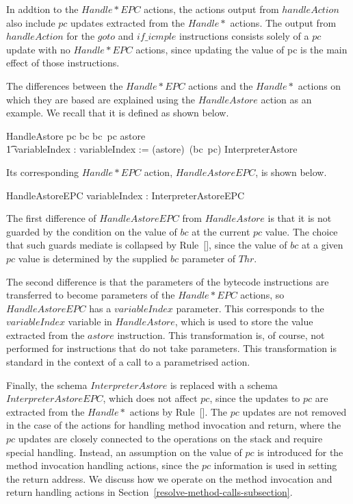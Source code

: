 In addtion to the $Handle{*}EPC$ actions, the actions output from
$handleAction$ also include $pc$ updates extracted from the $Handle*$
actions.
The output from $handleAction$ for the $goto$ and $if\_icmple$
instructions consists solely of a $pc$ update with no $Handle{*}EPC$
actions, since updating the value of pc is the main effect of those
instructions.

The differences between the $Handle{*}EPC$ actions and the $Handle*$
actions on which they are based are explained using the $HandleAstore$
action as an example.
We recall that it is defined as shown below.
\begin{circusaction}
  HandleAstore \circdef \lcircguard pc \in \dom bc \land bc~pc \in \ran astore \rcircguard \circguard \\
  \t1 \circvar variableIndex : \nat \circspot variableIndex := (astore\inv)~(bc~pc) \circseq \lschexpract InterpreterAstore \rschexpract
\end{circusaction}
Its corresponding $Handle{*}EPC$ action, $HandleAstoreEPC$, is shown
below.
\begin{circusaction}
  HandleAstoreEPC \circdef \circval variableIndex : \nat \circspot \lschexpract InterpreterAstoreEPC \rschexpract
\end{circusaction}
The first difference of $HandleAstoreEPC$ from $HandleAstore$ is that
it is not guarded by the condition on the value of $bc$ at the current
$pc$ value.
The choice that such guards mediate is collapsed by
Rule~[], since the value of
$bc$ at a given $pc$ value is determined by the supplied $bc$
parameter of $Thr$.

The second difference is that the parameters of the bytecode
instructions are transferred to become parameters of the
$Handle{*}EPC$ actions, so $HandleAstoreEPC$ has a $variableIndex$
parameter.
This corresponds to the $variableIndex$ variable in $HandleAstore$,
which is used to store the value extracted from the $astore$
instruction.
This transformation is, of course, not performed for instructions that
do not take parameters.
This transformation is standard in the context of a call to a
parametrised action.

Finally, the schema $InterpreterAstore$ is replaced with a schema
$InterpreterAstoreEPC$, which does not affect $pc$, since the updates to
$pc$ are extracted from the $Handle{*}$ actions by
Rule~[].
The $pc$ updates are not removed in the case of the actions for
handling method invocation and return, where the $pc$ updates are
closely connected to the operations on the stack and require special
handling.
Instead, an assumption on the value of $pc$ is introduced for the
method invocation handling actions, since the $pc$ information is used
in setting the return address.
We discuss how we operate on the method invocation and return handling
actions in Section~\ref{resolve-method-calls-subsection}.

